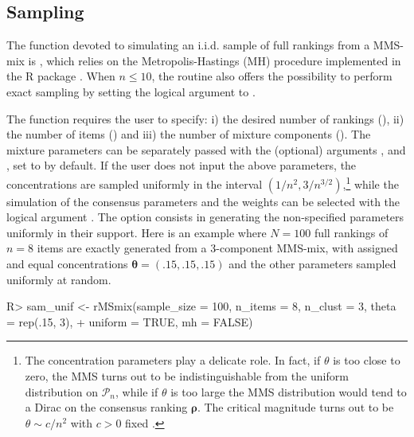 \subsection{Sampling}
\label{subsec:sampling}
The function devoted to simulating an i.i.d. sample of full rankings from a MMS-mix is , which relies on the Metropolis-Hastings (MH) procedure implemented in the \textsf{R} package  \citep{BayesMallows}. When $n\leq 10$, the routine also offers the possibility to perform exact sampling by setting the logical  argument to .


The  function requires the user to specify: i) the desired number of rankings (), ii) the number of items () and iii) the number of mixture components (). The mixture parameters can be separately passed with the (optional) arguments ,  and , set to  by default. If the user does not input the above parameters, the concentrations are sampled uniformly in the interval $(1/n^2,3/n^{3/2})$,\footnote{The concentration parameters play a delicate role. In fact, if $\theta$ is too close to zero, the MMS turns out to be indistinguishable from the uniform distribution on $\mathcal{P}_n$, while if $\theta$  is too large the MMS distribution would tend to a Dirac on the consensus ranking $\bm\rho$. The critical magnitude turns out to be $\theta\sim c/n^2$ with $c > 0$ fixed \citep{zhong2021mallows}.} while the simulation of the consensus parameters and the weights can be selected with the logical argument . The option  consists in generating the non-specified parameters uniformly in their support. Here is an example where $N=100$ full rankings of $n=8$ items are exactly generated from a 3-component MMS-mix, with assigned and equal concentrations $\bm\theta=(.15,.15,.15)$ and the other parameters sampled uniformly at random.
\begin{example}
R> sam_unif <- rMSmix(sample_size = 100, n_items = 8, n_clust = 3, theta = rep(.15, 3),
+               uniform = TRUE, mh = FALSE)
\end{example}

